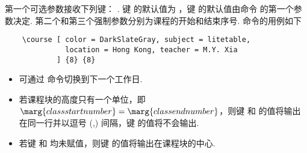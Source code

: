 \documentclass[letterpaper]{l3doc}
\newenvironment{example}{\begin{list}{}{\leftmargin=3em}\item }{\end{list}}
\begin{document}
\begin{example}
\end{example}

第一个可选参数接收下列键：    . 键  的默认值为 ，键  的默认值由命令  的第一个参数决定. 第二个和第三个强制参数分别为课程的开始和结束序号.  命令的用例如下

\begin{Verbatim}
    \course [ color = DarkSlateGray, subject = litetable,
              location = Hong Kong, teacher = M.Y. Xia
            ] {8} {8}
\end{Verbatim}

\begin{center}
    \noindent{}
\end{center}

\begin{itemize}
    \item 可通过  命令切换到下一个工作日.
    \item 若课程块的高度只有一个单位，即$\marg{class start number} = \marg{class end number}$，则键  和  的值将输出在同一行并以逗号 (,) 间隔，键  的值将不会输出.
    \item 若键  和  均未赋值，则键  的值将输出在课程块的中心.
\end{itemize}


\end{document}
